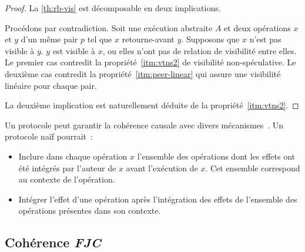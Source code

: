 \begin{proof}
La \autoref{th:rb-vis} est décomposable en deux implications.

Procédons par contradiction.
Soit une exécution abstraite $A$ et deux opérations $x$ et $y$ d'un même pair $p$ tel que $x$ retourne-avant $y$.
Supposons que $x$ n'est pas visible à $y$.
$y$ est visible à $x$, ou elles n'ont pas de relation de visibilité entre elles.
Le premier cas contredit la propriété~\ref{itm:vtns2} de visibilité non-spéculative.
Le deuxième cas contredit la propriété~\ref{itm:peer-linear} qui assure une visibilité linéaire pour chaque pair.

La deuxième implication est naturellement déduite de la propriété~\ref{itm:vtns2}.
\end{proof}


Un protocole peut garantir la cohérence causale avec divers mécanismes~\autocite{lamport_1978_time,fidge_1987_timestamps,prakash_1997_barrierbarrier}.
Un protocole naïf pourrait~:

\begin{itemize}
    \item Inclure dans chaque opération $x$ l'ensemble des opérations dont les effets ont été intégrés par l'auteur de $x$ avant l'exécution de $x$.
    Cet ensemble correspond au contexte de l'opération.
    \item Intégrer l'effet d'une opération après l'intégration des effets de l'ensemble des opérations présentes dans son contexte.
\end{itemize}


\subsection{Cohérence \emph{\acl{FJC}}}



